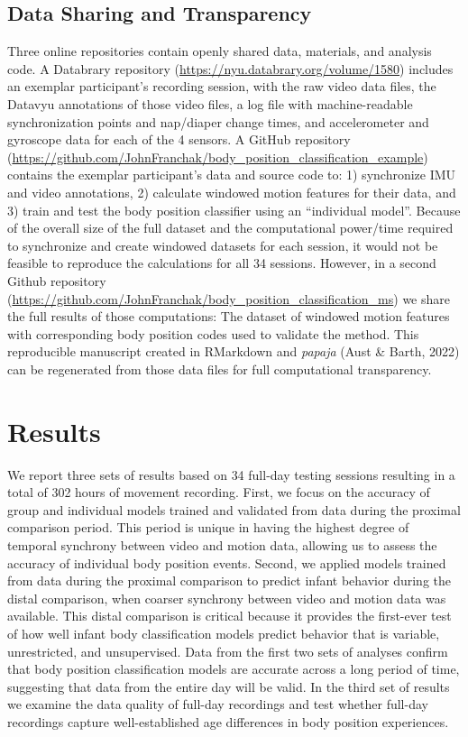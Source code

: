 \documentclass[
  man]{apa6}
\begin{document}
\hypertarget{data-sharing-and-transparency}{%
\subsection{Data Sharing and Transparency}\label{data-sharing-and-transparency}}

Three online repositories contain openly shared data, materials, and analysis code. A Databrary repository (\url{https://nyu.databrary.org/volume/1580}) includes an exemplar participant's recording session, with the raw video data files, the Datavyu annotations of those video files, a log file with machine-readable synchronization points and nap/diaper change times, and accelerometer and gyroscope data for each of the 4 sensors. A GitHub repository (\url{https://github.com/JohnFranchak/body_position_classification_example}) contains the exemplar participant's data and source code to: 1) synchronize IMU and video annotations, 2) calculate windowed motion features for their data, and 3) train and test the body position classifier using an ``individual model''. Because of the overall size of the full dataset and the computational power/time required to synchronize and create windowed datasets for each session, it would not be feasible to reproduce the calculations for all 34 sessions. However, in a second Github repository (\url{https://github.com/JohnFranchak/body_position_classification_ms}) we share the full results of those computations: The dataset of windowed motion features with corresponding body position codes used to validate the method. This reproducible manuscript created in RMarkdown and \emph{papaja} (Aust \& Barth, 2022) can be regenerated from those data files for full computational transparency.

\hypertarget{results}{%
\section{Results}\label{results}}

We report three sets of results based on 34 full-day testing sessions resulting in a total of 302 hours of movement recording. First, we focus on the accuracy of group and individual models trained and validated from data during the proximal comparison period. This period is unique in having the highest degree of temporal synchrony between video and motion data, allowing us to assess the accuracy of individual body position events. Second, we applied models trained from data during the proximal comparison to predict infant behavior during the distal comparison, when coarser synchrony between video and motion data was available. This distal comparison is critical because it provides the first-ever test of how well infant body classification models predict behavior that is variable, unrestricted, and unsupervised. Data from the first two sets of analyses confirm that body position classification models are accurate across a long period of time, suggesting that data from the entire day will be valid. In the third set of results we examine the data quality of full-day recordings and test whether full-day recordings capture well-established age differences in body position experiences.
\end{document}
